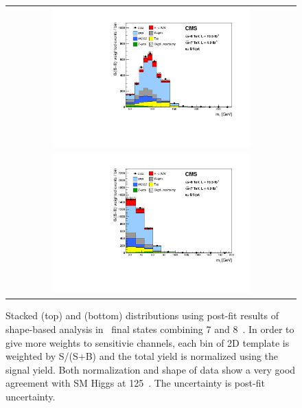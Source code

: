 \begin{figure}[htp] 
\centering 
\begin{tabular}{c} 
\includegraphics[width=0.7\textwidth]{figures/st_mt.pdf}
\\
\includegraphics[width=0.7\textwidth]{figures/st_mll.pdf}
\end{tabular} 
\caption{Stacked \mT(top) and \mll(bottom) distributions using post-fit results 
of shape-based analysis
in \DF\ final states combining 7 and 8~\TeV.
In order to give more weights to sensitivie channels, each bin of 2D 
template is weighted by S/(S+B) and the total yield is normalized using the signal yield. 
Both normalization and shape of data show a very good agreement with SM Higgs at 125~\GeV.
The uncertainty is post-fit uncertainty.} 
\label{fig:post1Dprojection_st} 
\end{figure} 
%

